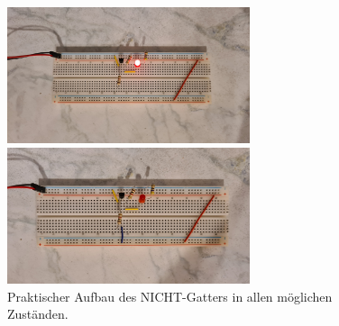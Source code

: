 \newpage
\begin{figure}[h!]
	\begin{minipage}{.5\textwidth}
		\centering
		\includegraphics[height=4cm, keepaspectratio]{./Fotos/NICHT-0.jpg}
	\end{minipage}%
	\begin{minipage}{.5\textwidth}
		\centering
		\includegraphics[height=4cm, keepaspectratio]{./Fotos/NICHT-1.jpg}
	\end{minipage}
	\caption{Praktischer Aufbau des NICHT-Gatters in allen möglichen Zuständen.}
\end{figure}


